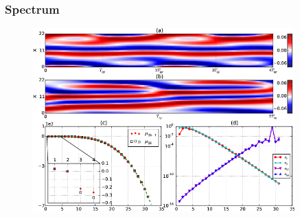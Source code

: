 \documentclass[mathserif, handout]{beamer}
\begin{document}
\begin{frame}
  \frametitle{Spectrum}

  \begin{figure}[h]
    \centering
    \includegraphics[width=0.9\textwidth]{pprpfigure.png}
  \end{figure}

\end{frame}
\end{document}
